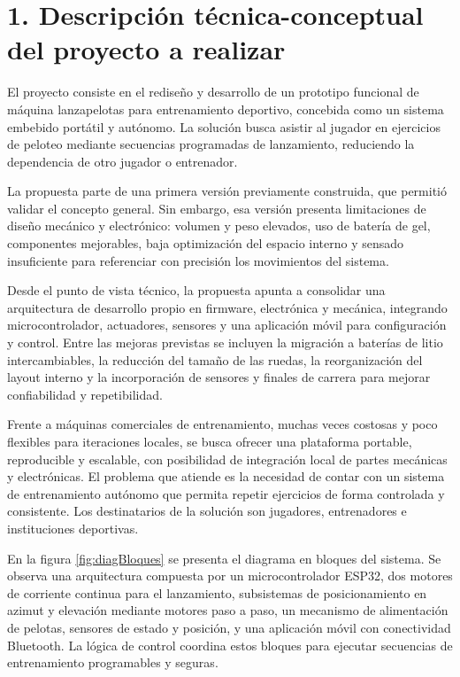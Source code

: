 ﻿\documentclass[
11pt, %
]{charter}
\begin{document}
\section{1. Descripción técnica-conceptual del proyecto a realizar}
\label{sec:descripcion}

El proyecto consiste en el rediseño y desarrollo de un prototipo funcional de máquina lanzapelotas para entrenamiento deportivo, concebida como un sistema embebido portátil y autónomo. La solución busca asistir al jugador en ejercicios de peloteo mediante secuencias programadas de lanzamiento, reduciendo la dependencia de otro jugador o entrenador.

La propuesta parte de una primera versión previamente construida, que permitió validar el concepto general. Sin embargo, esa versión presenta limitaciones de diseño mecánico y electrónico: volumen y peso elevados, uso de batería de gel, componentes mejorables, baja optimización del espacio interno y sensado insuficiente para referenciar con precisión los movimientos del sistema.

Desde el punto de vista técnico, la propuesta apunta a consolidar una arquitectura de desarrollo propio en firmware, electrónica y mecánica, integrando microcontrolador, actuadores, sensores y una aplicación móvil para configuración y control. Entre las mejoras previstas se incluyen la migración a baterías de litio intercambiables, la reducción del tamaño de las ruedas, la reorganización del layout interno y la incorporación de sensores y finales de carrera para mejorar confiabilidad y repetibilidad.

Frente a máquinas comerciales de entrenamiento, muchas veces costosas y poco flexibles para iteraciones locales, se busca ofrecer una plataforma portable, reproducible y escalable, con posibilidad de integración local de partes mecánicas y electrónicas. El problema que atiende es la necesidad de contar con un sistema de entrenamiento autónomo que permita repetir ejercicios de forma controlada y consistente. Los destinatarios de la solución son jugadores, entrenadores e instituciones deportivas.

En la figura \ref{fig:diagBloques} se presenta el diagrama en bloques del sistema. Se observa una arquitectura compuesta por un microcontrolador ESP32, dos motores de corriente continua para el lanzamiento, subsistemas de posicionamiento en azimut y elevación mediante motores paso a paso, un mecanismo de alimentación de pelotas, sensores de estado y posición, y una aplicación móvil con conectividad Bluetooth. La lógica de control coordina estos bloques para ejecutar secuencias de entrenamiento programables y seguras.
\end{document}
